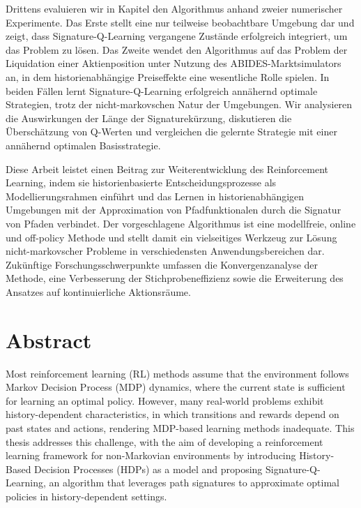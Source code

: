 \documentclass[
    a4paper,
    11pt,
    bibliography=totoc,
    listof=totoc,      
    headinclude=true,
    cleardoublepage=empty,
]{scrbook}
\theoremstyle{plain}
\theoremstyle{definition}
\theoremstyle{remark}
\begin{document}
Drittens evaluieren wir in Kapitel  den Algorithmus anhand zweier numerischer Experimente. Das Erste stellt eine nur teilweise beobachtbare Umgebung dar und zeigt, dass Signature-Q-Learning vergangene Zustände erfolgreich integriert, um das Problem zu lösen. Das Zweite wendet den Algorithmus auf das Problem der Liquidation einer Aktienposition unter Nutzung des ABIDES-Marktsimulators an, in dem historienabhängige Preiseffekte eine wesentliche Rolle spielen. In beiden Fällen lernt Signature-Q-Learning erfolgreich annähernd optimale Strategien, trotz der nicht-markovschen Natur der Umgebungen. Wir analysieren die Auswirkungen der Länge der Signaturekürzung, diskutieren die Überschätzung von Q-Werten und vergleichen die gelernte Strategie mit einer annähernd optimalen Basisstrategie.

Diese Arbeit leistet einen Beitrag zur Weiterentwicklung des Reinforcement Learning, indem sie historienbasierte Entscheidungsprozesse als  Modellierungsrahmen einführt und das Lernen in historienabhängigen Umgebungen mit der Approximation von Pfadfunktionalen durch die Signatur von Pfaden verbindet. Der vorgeschlagene Algorithmus ist eine modellfreie, online und off-policy Methode und stellt damit ein vielseitiges Werkzeug zur Lösung nicht-markovscher Probleme in verschiedensten Anwendungsbereichen dar. Zukünftige Forschungsschwerpunkte umfassen die Konvergenzanalyse der Methode, eine Verbesserung der Stichprobeneffizienz sowie die Erweiterung des Ansatzes auf kontinuierliche Aktionsräume.

\clearpage

\chapter*{Abstract}

Most reinforcement learning (RL) methods assume that the environment follows Markov Decision Process (MDP) dynamics, where the current state is sufficient for learning an optimal policy. However, many real-world problems exhibit history-dependent characteristics, in which transitions and rewards depend on past states and actions, rendering MDP-based learning methods inadequate. This thesis addresses this challenge, with the aim of developing a reinforcement learning framework for non-Markovian environments by introducing History-Based Decision Processes (HDPs) as a model and proposing Signature-Q-Learning, an algorithm that leverages path signatures to approximate optimal policies in history-dependent settings.
\end{document}
